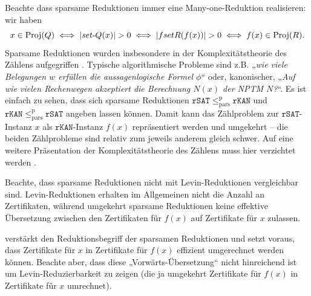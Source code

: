 Beachte dass sparsame Reduktionen immer eine Many-one-Reduktion realisieren: wir haben 
\[ x\in\Proj(Q) \iff |\fset{}Q(x)|>0 \iff |fset{}R(f(x))|>0 \iff f(x)\in\Proj(R). \]
Sparsame Reduktionen wurden insbesondere in der Komplexitätstheorie des Zählens aufgegriffen \parencites{simon_central_1975}{valiant_complexity_1979}. Typische algorithmische Probleme sind z.B. „\emph{wie viele Belegungen $w$ erfüllen die aussagenlogische Formel $\phi$}“ oder, kanonischer, „\emph{Auf wie vielen Rechenwegen akzeptiert die Berechnung $N(x)$ der NPTM $N$?}“. Es ist einfach zu sehen, dass sich sparsame Reduktionen $\mathtt{rSAT}\leq_\mathrm{pars}^\mathrm p \mathtt{rKAN}$ und $\mathtt{rKAN}\leq_\mathrm{pars}^\mathrm p \mathtt{rSAT}$ angeben lassen können. Damit kann das Zählproblem zur $\mathtt{rSAT}$-Instanz $x$ als $\mathtt{rKAN}$-Instanz $f(x)$ repräsentiert werden und umgekehrt – die beiden Zählprobleme sind relativ zum jeweils anderem gleich schwer. Auf eine weitere Präsentation der Komplexitätstheorie des Zählens muss hier verzichtet werden \parencites(siehe)()[Kap.~7]{wechsung_vorlesungen_2000}[Chap.~17]{arora_computational_2009}.

Beachte, dass sparsame Reduktionen nicht mit Levin-Reduktionen vergleichbar sind. Levin-Reduktionen erhalten im Allgemeinen nicht die Anzahl an Zertifikaten, während umgekehrt sparsame Reduktionen keine effektive Übersetzung zwischen den Zertifikaten für $f(x)$ auf Zertifikate für $x$ zulassen.
%

\textcite{lynch_structure_1978} verstärkt den Reduktionsbegriff der sparsamen Reduktionen und setzt voraus, dass Zertifikate für $x$ in Zertifikate für $f(x)$ effizient umgerechnet werden können. Beachte aber, dass diese „Vorwärts-Übersetzung“ nicht hinreichend ist um Levin-Reduzierbarkeit zu zeigen (die ja umgekehrt Zertifikate für $f(x)$ in Zertifikate für $x$ umrechnet).

